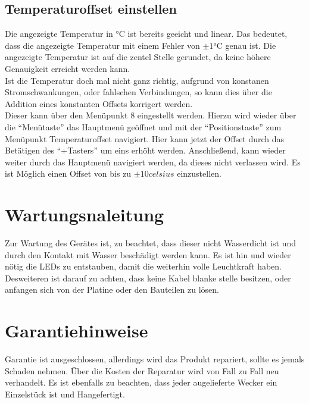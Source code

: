 \documentclass[12pt,a4paper,titlepage,headinclude]{scrartcl}
\numberwithin{equation}{subsection}
\begin{document}
\subsection{Temperaturoffset einstellen}
Die angezeigte Temperatur in \si{\celsius} ist bereits geeicht und linear.
Das bedeutet, dass die angezeigte Temperatur mit einem Fehler von $\pm1\si{\celsius}$ genau ist.
Die angezeigte Temperatur ist auf die zentel Stelle gerundet, da keine höhere Genauigkeit erreicht werden kann.\\
Ist die Temperatur doch mal nicht ganz richtig, aufgrund von konstanen Stromschwankungen, oder fahlschen Verbindungen, so kann dies über die Addition eines konstanten Offsets korrigert werden.\\
Dieser kann über den Menüpunkt 8 eingestellt werden.
Hierzu wird wieder über die "`Menütaste"' das Hauptmenü geöffnet und mit der "`Positionstaste"' zum Menüpunkt Temperaturoffset navigiert.
Hier kann jetzt der Offset durch das Betätigen des "`+Tasters"' um eins erhöht werden.
Anschließend, kann wieder weiter durch das Hauptmenü navigiert werden, da dieses nicht verlassen wird.
Es ist Möglich einen Offset von bis zu $\pm10\si{celsius}$ einzustellen.


\section{Wartungsnaleitung}
\label{sec:wartungsanleitung}
Zur Wartung des Gerätes ist, zu beachtet, dass dieser nicht Wasserdicht ist und durch den Kontakt mit Wasser beschädigt werden kann.
Es ist hin und wieder nötig die LEDs zu entstauben, damit die weiterhin volle Leuchtkraft haben.
Desweiteren ist darauf zu achten, dass keine Kabel blanke stelle besitzen, oder anfangen sich von der Platine oder den Bauteilen zu lösen.

\section{Garantiehinweise}
\label{sec:Garantiehinweise}
Garantie ist ausgeschlossen, allerdings wird das Produkt repariert, sollte es jemals Schaden nehmen.
Über die Kosten der Reparatur wird von Fall zu Fall neu verhandelt.
Es ist ebenfalls zu beachten, dass jeder augelieferte Wecker ein Einzelstück ist und Hangefertigt.

\newpage
\printbibliography[heading=bibintoc]
\end{document}
